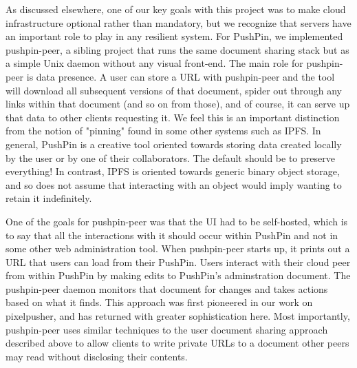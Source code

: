 \documentclass[sigplan,10pt]{acmart}
\begin{document}
As discussed elsewhere, one of our key goals with this project was to make cloud infrastructure optional rather than mandatory, but we recognize that servers have an important role to play in any resilient system. For PushPin, we implemented pushpin-peer, a sibling project that runs the same document sharing stack but as a simple Unix daemon without any visual front-end. The main role for pushpin-peer is data presence. A user can store a URL with pushpin-peer and the tool will download all subsequent versions of that document, spider out through any links within that document (and so on from those), and of course, it can serve up that data to other clients requesting it. We feel this is an important distinction from the notion of "pinning" found in some other systems such as IPFS. In general, PushPin is a creative tool oriented towards storing data created locally by the user or by one of their collaborators. The default should be to preserve everything! In contrast, IPFS is oriented towards generic binary object storage, and so does not assume that interacting with an object would imply wanting to retain it indefinitely.

One of the goals for pushpin-peer was that the UI had to be self-hosted, which is to say that all the interactions with it should occur within PushPin and not in some other web administration tool. When pushpin-peer starts up, it prints out a URL that users can load from their PushPin. Users interact with their cloud peer from within PushPin by making edits to PushPin's adminstration document. The pushpin-peer daemon monitors that document for changes and takes actions based on what it finds. This approach was first pioneered in our work on pixelpusher, and has returned with greater sophistication here. Most importantly, pushpin-peer uses similar techniques to the user document sharing approach described above to allow clients to write private URLs to a document other peers may read without disclosing their contents.


\end{document}
